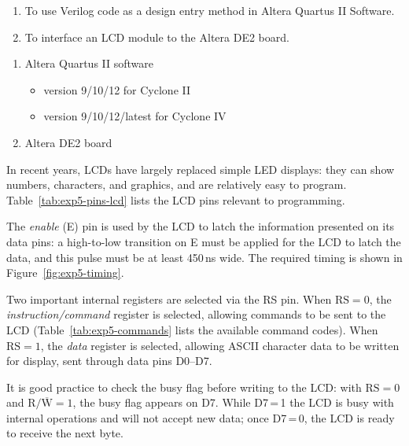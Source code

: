 
\begin{objectives}
  \begin{enumerate}
    \item To use Verilog code as a design entry method in Altera Quartus II Software.
    \item To interface an LCD module to the Altera DE2 board.
  \end{enumerate}
\end{objectives}

\begin{equipment}
  \begin{enumerate}
    \item Altera Quartus II software
          \begin{itemize}
            \item version 9/10/12 for Cyclone II
            \item version 9/10/12/latest for Cyclone IV
          \end{itemize}
    \item Altera DE2 board
  \end{enumerate}
\end{equipment}

\begin{introduction}
  In recent years, LCDs have largely replaced simple LED displays: they can show numbers, characters, and graphics, and are relatively easy to program. Table~\ref{tab:exp5-pins-lcd} lists the LCD pins relevant to programming.
  \vspace*{10pt}

  The \textit{enable} (E) pin is used by the LCD to latch the information presented on its data pins: a high-to-low transition on E must be applied for the LCD to latch the data, and this pulse must be at least 450\,ns wide. The required timing is shown in Figure~\ref{fig:exp5-timing}.
  \vspace*{10pt}

  Two important internal registers are selected via the RS pin. When $\text{RS}=0$, the \textit{instruction/command} register is selected, allowing commands to be sent to the LCD (Table~\ref{tab:exp5-commands} lists the available command codes). When $\text{RS}=1$, the \textit{data} register is selected, allowing ASCII character data to be written for display, sent through data pins D0--D7.
  \vspace*{10pt}

  It is good practice to check the busy flag before writing to the LCD: with $\text{RS}=0$ and $\text{R}/\overline{\text{W}}=1$, the busy flag appears on D7. While D7\,=\,1 the LCD is busy with internal operations and will not accept new data; once D7\,=\,0, the LCD is ready to receive the next byte.
\end{introduction}


